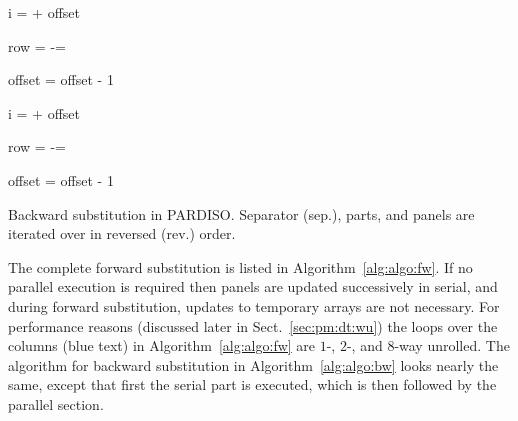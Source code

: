 \begin{algorithm}[tp]
   \begin{algorithmic}[1]
        
         \For{\textcolor{blue}{col. $j$ in panel $p$ rev.}} \label{alg:bw:1}
            \State i = \nxindx[p] + offset
        
                \State row = \nindx[i++]
                \State \nr[j] -= \nr[row] \nlnz[k] 
            \EndFor

            \State offset = offset - 1
          \EndFor
        \EndFor

        \State
 
         
            \For{\textcolor{blue}{col. $j$ in panel $p$ rev.}} \label{alg:bw:2}

              \State i = \nxindx[p] + offset

                \State row = \nindx[i++]
                \State \nr[j] -=  \nr[row] \nlnz[k] 
              \EndFor

              \State offset = offset - 1

            \EndFor
          \EndFor
        \EndFor
        \EndProcedure
   \end{algorithmic}
   \caption{Backward substitution in PARDISO. Separator (sep.), parts, and
panels are iterated over in reversed (rev.) order.}
   \label{alg:algo:bw}
\end{algorithm}


The complete forward substitution is listed in Algorithm~\ref{alg:algo:fw}.
If no parallel execution is required then panels are updated successively in
serial, and during forward substitution, updates to temporary arrays are not
necessary.
For performance reasons (discussed later in Sect.~\ref{sec:pm:dt:wu}) the
loops over the columns (blue text) in Algorithm~\ref{alg:algo:fw} are $1$-,
$2$-, and $8$-way unrolled.
The algorithm for backward substitution in Algorithm~\ref{alg:algo:bw} 
looks nearly the same, except that first
the serial part is executed, which is then followed by the parallel section.
%

